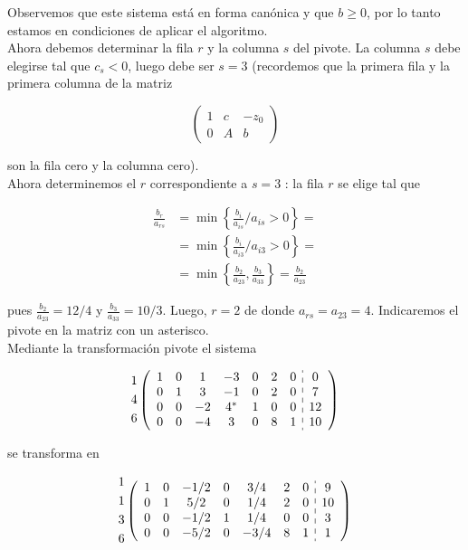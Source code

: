 \documentclass[10pt]{article}
\begin{document}
Observemos que este sistema está en forma canónica y que $b \geq 0$, por lo tanto estamos en condiciones de aplicar el algoritmo.\\
Ahora debemos determinar la fila $r$ y la columna $s$ del pivote. La columna $s$ debe elegirse tal que $c_{s}<0$, luego debe ser $s=3$ (recordemos que la primera fila y la primera columna de la matriz

$$
\left(\begin{array}{cc|c}
1 & c & -z_{0} \\
0 & A & b
\end{array}\right)
$$

son la fila cero y la columna cero).\\
Ahora determinemos el $r$ correspondiente a $s=3$ : la fila $r$ se elige tal que

$$
\begin{aligned}
\frac{b_{r}}{a_{r s}} & =\min \left\{\frac{b_{i}}{a_{i s}} / a_{i s}>0\right\}= \\
& =\min \left\{\frac{b_{i}}{a_{i 3}} / a_{i 3}>0\right\}= \\
& =\min \left\{\frac{b_{2}}{a_{23}}, \frac{b_{3}}{a_{33}}\right\}=\frac{b_{2}}{a_{23}}
\end{aligned}
$$

pues $\frac{b_{2}}{a_{23}}=12 / 4$ y $\frac{b_{3}}{a_{33}}=10 / 3$. Luego, $r=2$ de donde $a_{r s}=a_{23}=4$. Indicaremos el pivote en la matriz con un asterisco.\\
Mediante la transformación pivote el sistema

$$
\begin{aligned}
& 1 \\
& 4 \\
& 6
\end{aligned}\left(\begin{array}{ccccccc:c}
1 & 0 & 1 & -3 & 0 & 2 & 0 & 0 \\
0 & 1 & 3 & -1 & 0 & 2 & 0 & 7 \\
0 & 0 & -2 & 4^{*} & 1 & 0 & 0 & 12 \\
0 & 0 & -4 & 3 & 0 & 8 & 1 & 10
\end{array}\right)
$$

se transforma en

$$
\begin{aligned}
& 1 \\
& 1 \\
& 3 \\
& 6
\end{aligned}\left(\begin{array}{ccccccc:c}
1 & 0 & -1 / 2 & 0 & 3 / 4 & 2 & 0 & 9 \\
0 & 1 & 5 / 2 & 0 & 1 / 4 & 2 & 0 & 10 \\
0 & 0 & -1 / 2 & 1 & 1 / 4 & 0 & 0 & 3 \\
0 & 0 & -5 / 2 & 0 & -3 / 4 & 8 & 1 & 1
\end{array}\right)
$$
\end{document}
